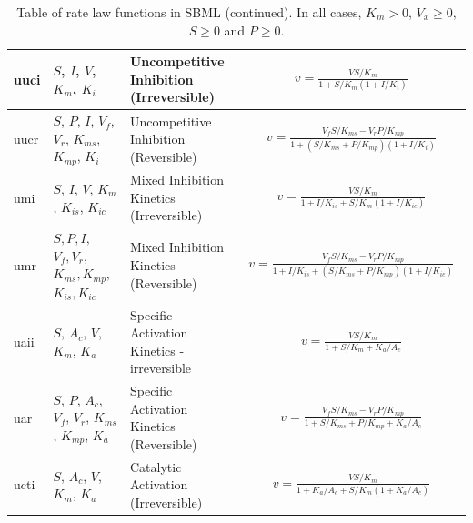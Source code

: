 \documentclass[10pt]{cekarticle}
\newcommand{\changed}[1]{\textcolor{BrickRed}{#1}}
\begin{document}
\begin{table}[ht]
\begin{tabular}{|p{0.5in}|>{\raggedright}m{0.77in}|>{\raggedright}m{1.5in}|m{3in}|}
uuci & $S$, $I$, $V$, $K_m$, $K_i$ & Uncompetitive Inhibition
(Irreversible) &
\begin{gather*}
v = \frac{V S/K_m}{1 + S/K_m \left( 1 + I/K_i\right)}
\end{gather*}
\\ \hline

uucr & $S$, $P$, $I$, $V_f$, $V_r$, $K_{ms}$, $K_{mp}$, $K_i$ &
Uncompetitive Inhibition (Reversible) &
\begin{gather*}
v = \frac{V_f S/K_{ms} - V_r
P/K_{mp}}{1 + \left( S/K_{ms} + P/K_{mp} \right) \left( 1 + I/K_i\right) }
\end{gather*}
\\ \hline

umi & $S$, $I$, $V$, $K_m$, $K_{is}$, $K_{ic}$ & Mixed Inhibition
Kinetics (Irreversible) &
\begin{gather*}
v = \frac{V S/K_m}{1 + I/K_{is} + S/K_m \left( 1 + I/K_{ic} \right) }
\end{gather*}
\\ \hline

umr & $ S, P, I,$ $ V_f, V_r, $ $ K_{ms}, K_{mp}, $ $ K_{is}, K_{ic} $ & Mixed
Inhibition Kinetics (Reversible) &
\begin{gather*}
v = \frac{V_f S/K_{ms} - V_r
P/K_{mp}}{1 + I/K_{is} + \left( S/K_{ms} + P/K_{mp} \right) \left( 1 + I/K_{ic}
\right) }
\end{gather*}
\\ \hline

\changed{uaii} & $S$, $A_c$, $V$, $K_m$, $K_a$ & Specific Activation Kinetics -
irreversible &
\begin{gather*}
v = \frac{V S/K_m}{1 + S/K_m + K_a/A_c}
\end{gather*}
\\ \hline

uar & $S$, $P$, $A_c$, $V_f$, $V_r$, $K_{ms}$, $K_{mp}$, $K_a$ & Specific
Activation Kinetics (Reversible) &
\begin{gather*}
v = \frac{V_f S/K_{ms} - V_r P/K_{mp}}{1 + S/K_{ms} + P/K_{mp} + K_a/A_c}
\end{gather*}
\\ \hline

ucti & $S$, $A_c$, $V$, $K_m$, $K_a$ & Catalytic Activation
(Irreversible) &
\begin{gather*}
v = \frac{V S/K_m}{1 + K_a/A_c + S/K_m \left( 1 + K_a/A_c\right)}
\end{gather*}
\\ \hline

\end{tabular}
\caption{Table of rate law functions in SBML (continued).  In all cases, $K_m > 0$, $V_x \geq 0$, $S
  \geq 0$ and $P \geq 0$.}
\end{table}
\end{document}
